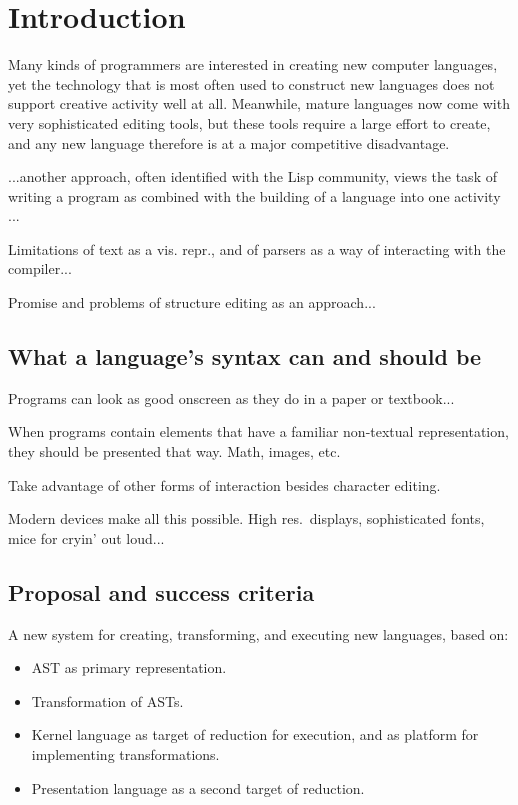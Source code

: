 \section{Introduction}

Many kinds of programmers are interested in creating new computer languages, yet the technology that is most often used to construct new languages does not support creative activity well at all. Meanwhile, mature languages now come with very sophisticated editing tools\cite{eclipse}, but these tools require a large effort to create, and any new language therefore is at a major competitive disadvantage.

...another approach, often identified with the Lisp community, views the task of writing a program as combined with the building of a language into one activity \cite{on-lisp}...

Limitations of text as a vis. repr., and of parsers as a way of interacting with the compiler...

Promise and problems of structure editing as an approach...


\subsection{What a language's syntax can and should be}

Programs can look as good onscreen as they do in a paper or textbook...

When programs contain elements that have a familiar non-textual representation, they should be presented that way. Math, images, etc.

Take advantage of other forms of interaction besides character editing. 

Modern devices make all this possible. High res.~displays, sophisticated fonts, mice for cryin' out loud...


\subsection{Proposal and success criteria}

A new system for creating, transforming, and executing new languages, based on:

\begin{itemize}
\item AST as primary representation.
\item Transformation of ASTs.
\item Kernel language as target of reduction for execution, and as platform for implementing transformations.
\item Presentation language as a second target of reduction.
\end{itemize}


